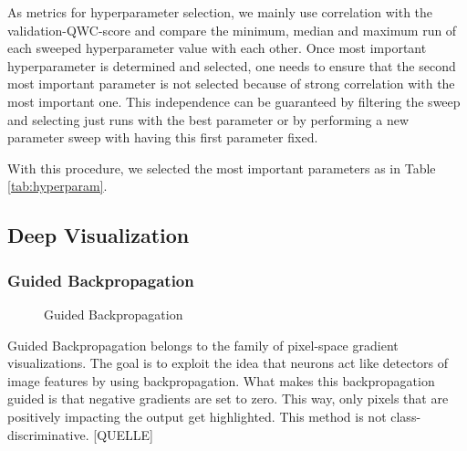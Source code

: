 \documentclass{article}
\begin{document}
As metrics for hyperparameter selection, we mainly use correlation with the validation-QWC-score and 
compare the minimum, median and maximum run of each sweeped hyperparameter value with each other. 
Once most important hyperparameter is determined and selected, one needs to ensure that the second most important
parameter is not selected because of strong correlation with the most important one. This independence can be 
guaranteed by filtering the sweep and selecting just runs with the best parameter or by performing a new parameter sweep
with having this first parameter fixed.

With this procedure, we selected the most important parameters as in Table \ref{tab:hyperparam}.





\subsection{Deep Visualization}
\subsubsection{Guided Backpropagation}
\begin{figure}%
  \vspace{-50pt}
  \centering
  \hspace{0.5cm}
  \caption{Guided Backpropagation}
\end{figure}
Guided Backpropagation belongs to the family of pixel-space gradient visualizations. 
The goal is to exploit the idea that neurons act like detectors of image features by using backpropagation.
What makes this backpropagation guided is that negative gradients are set to zero. This way, only pixels that are positively impacting 
the output get highlighted. This method is not class-discriminative. [QUELLE] 
\end{document}
